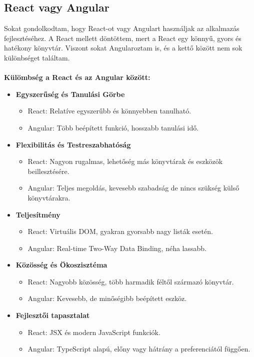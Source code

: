 \subsection*{React vagy Angular}
Sokat gondolkodtam, hogy React-ot vagy Angulart használjak az alkalmazás fejlesztéséhez.
A React mellett döntöttem, mert a React egy könnyű, gyors és hatékony könyvtár.
Viszont sokat Angularoztam is, és a kettő között nem sok különbséget találtam.
\\
\\
\textbf{Külömbség a React és az Angular között:}
\begin{itemize}[noitemsep, nolistsep]
    \item \textbf{Egyszerűség és Tanulási Görbe}
          \begin{itemize}
              \item React: Relatíve egyszerűbb és könnyebben tanulható.
              \item Angular: Több beépített funkció, hosszabb tanulási idő.
          \end{itemize}

    \item \textbf{Flexibilitás és Testreszabhatóság}
          \begin{itemize}
              \item React: Nagyon rugalmas, lehetőség más könyvtárak és eszközök beillesztésére.
              \item Angular: Teljes megoldás, kevesebb szabadság de nincs szükség külső könyvtárakra.
          \end{itemize}

    \item \textbf{Teljesítmény}
          \begin{itemize}
              \item React: Virtuális DOM, gyakran gyorsabb nagy listák esetén.
              \item Angular: Real-time Two-Way Data Binding, néha lassabb.
          \end{itemize}

    \item \textbf{Közösség és Ökoszisztéma}
          \begin{itemize}
              \item React: Nagyobb közösség, több harmadik féltől származó könyvtár.
              \item Angular: Kevesebb, de minőségibb beépített eszköz.
          \end{itemize}

    \item \textbf{Fejlesztői tapasztalat}
          \begin{itemize}
              \item React: JSX és modern JavaScript funkciók.
              \item Angular: TypeScript alapú, előny vagy hátrány a preferenciától függően.
          \end{itemize}
\end{itemize}
